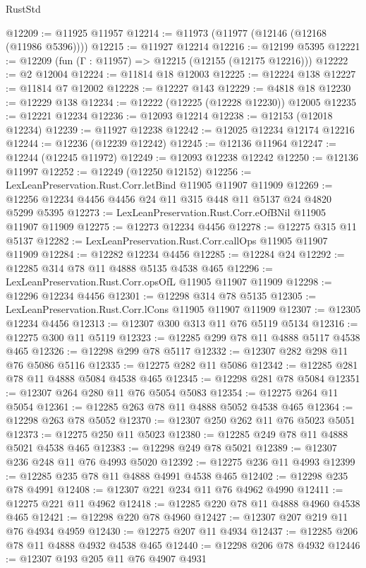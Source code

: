 \begin{lexlean}{RustStd}
\begin{coremodule}
@12209 := @11925 @11957
@12214 := @11973 (@11977 (@12146 (@12168 (@11986 @5396))))
@12215 := @11927 @12214
@12216 := @12199 @5395
@12221 := @12209 (fun (Γ : @11957) => @12215 (@12155 (@12175 @12216)))
@12222 := @2 @12004
@12224 := @11814 @18 @12003
@12225 := @12224 @138
@12227 := @11814 @7 @12002
@12228 := @12227 @143
@12229 := @4818 @18
@12230 := @12229 @138
@12234 := @12222 (@12225 (@12228 @12230)) @12005
@12235 := @12221 @12234
@12236 := @12093 @12214
@12238 := @12153 (@12018 @12234)
@12239 := @11927 @12238
@12242 := @12025 @12234 @12174 @12216
@12244 := @12236 (@12239 @12242)
@12245 := @12136 @11964
@12247 := @12244 (@12245 @11972)
@12249 := @12093 @12238 @12242
@12250 := @12136 @11997
@12252 := @12249 (@12250 @12152)
@12256 := LexLeanPreservation.Rust.Corr.letBind @11905 @11907 @11909
@12269 := @12256 @12234 @4456 @4456 @24 @11 @315 @448 @11 @5137 @24 @4820 @5299 @5395
@12273 := LexLeanPreservation.Rust.Corr.eOfBNil @11905 @11907 @11909
@12275 := @12273 @12234 @4456
@12278 := @12275 @315 @11 @5137
@12282 := LexLeanPreservation.Rust.Corr.callOps @11905 @11907 @11909
@12284 := @12282 @12234 @4456
@12285 := @12284 @24
@12292 := @12285 @314 @78 @11 @4888 @5135 @4538 @465
@12296 := LexLeanPreservation.Rust.Corr.opsOfL @11905 @11907 @11909
@12298 := @12296 @12234 @4456
@12301 := @12298 @314 @78 @5135
@12305 := LexLeanPreservation.Rust.Corr.lCons @11905 @11907 @11909
@12307 := @12305 @12234 @4456
@12313 := @12307 @300 @313 @11 @76 @5119 @5134
@12316 := @12275 @300 @11 @5119
@12323 := @12285 @299 @78 @11 @4888 @5117 @4538 @465
@12326 := @12298 @299 @78 @5117
@12332 := @12307 @282 @298 @11 @76 @5086 @5116
@12335 := @12275 @282 @11 @5086
@12342 := @12285 @281 @78 @11 @4888 @5084 @4538 @465
@12345 := @12298 @281 @78 @5084
@12351 := @12307 @264 @280 @11 @76 @5054 @5083
@12354 := @12275 @264 @11 @5054
@12361 := @12285 @263 @78 @11 @4888 @5052 @4538 @465
@12364 := @12298 @263 @78 @5052
@12370 := @12307 @250 @262 @11 @76 @5023 @5051
@12373 := @12275 @250 @11 @5023
@12380 := @12285 @249 @78 @11 @4888 @5021 @4538 @465
@12383 := @12298 @249 @78 @5021
@12389 := @12307 @236 @248 @11 @76 @4993 @5020
@12392 := @12275 @236 @11 @4993
@12399 := @12285 @235 @78 @11 @4888 @4991 @4538 @465
@12402 := @12298 @235 @78 @4991
@12408 := @12307 @221 @234 @11 @76 @4962 @4990
@12411 := @12275 @221 @11 @4962
@12418 := @12285 @220 @78 @11 @4888 @4960 @4538 @465
@12421 := @12298 @220 @78 @4960
@12427 := @12307 @207 @219 @11 @76 @4934 @4959
@12430 := @12275 @207 @11 @4934
@12437 := @12285 @206 @78 @11 @4888 @4932 @4538 @465
@12440 := @12298 @206 @78 @4932
@12446 := @12307 @193 @205 @11 @76 @4907 @4931

\end{coremodule}
\end{lexlean}
